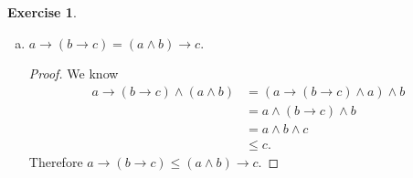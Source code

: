 \documentclass{article}
\theoremstyle{definition}
\newtheorem{question}{Exercise}
\begin{document}
\begin{question}
\begin{enumerate}[(a)]
              \begin{proof}
                  We know this inequality is true iff \((\neg a\vee\neg
                  b)\wedge(a\wedge b)=0\). Using distributivity we see this
                  expression is equal to
                  \begin{align*}
                      (\neg a\vee\neg b)\wedge(a\wedge b) & =(\neg a\wedge(a\wedge b))\vee(\neg b\wedge(a\wedge b))            \\
                                                          & =((a\wedge\neg a)\wedge\neg b)\wedge((\neg b\wedge b)\wedge\neg a) \\
                                                          & =0\wedge0                                                          \\
                                                          & =0.
                  \end{align*}
                  A counterexample for the other implication is
                  \[
                      \begin{tikzcd}[ampersand replacement=\&]
                          \& 1 \\
                          \& c \\
                          a \&\& b \\
                          \& 0
                          \arrow[from=2-2, to=1-2]
                          \arrow[from=3-1, to=2-2]
                          \arrow[from=3-3, to=2-2]
                          \arrow[from=4-2, to=3-1]
                          \arrow[from=4-2, to=3-3]
                      \end{tikzcd}
                  \]
                  This is a distributive lattice because neither
                  \(\mathbb{M}_{5}\) nor \(\mathbb{D}_{3}\) can be embedded in
                  it. It is finite and satisfies the infinite distributivity law
                  trivially. However \(\neg(a\wedge b)=1\) but
                  \(\neg a=b\) and \(\neg b=a\) so \(\neg a\vee\neg b=c\).
              \end{proof}

        \item \(a\to(b\to c)=(a\wedge b)\to c\).

              \begin{proof}
                  We know
                  \begin{align*}
                      a\to(b\to c)\wedge(a\wedge b) & =(a\to(b\to c)\wedge a)\wedge b \\
                                                    & =a\wedge (b\to c)\wedge b       \\
                                                    & =a\wedge b\wedge c              \\
                                                    & \leq c.
                  \end{align*}
                  Therefore \(a\to(b\to c)\leq(a\wedge b)\to c\).


\end{proof}
\end{enumerate}
\end{question}
\end{document}
